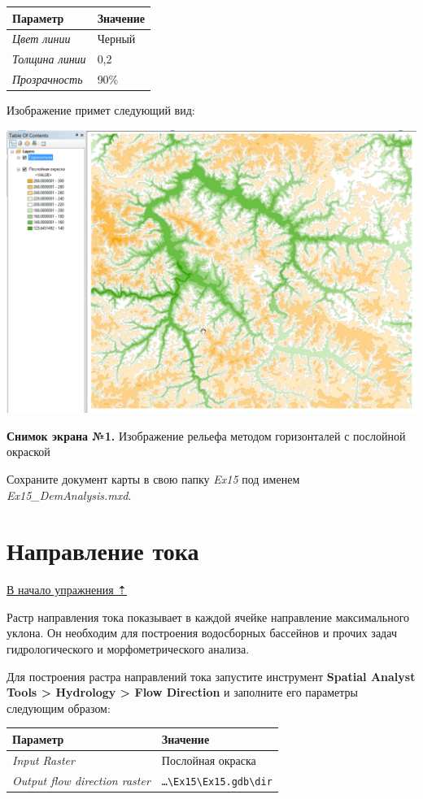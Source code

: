 \documentclass[]{book}
\theoremstyle{definition}
\theoremstyle{definition}
\theoremstyle{definition}
\theoremstyle{remark}
\begin{document}
\begin{enumerate}
  \begin{longtable}[]{@{}ll@{}}
  \toprule
  Параметр & Значение\tabularnewline
  \midrule
  \endhead
  \emph{Цвет линии} & Черный\tabularnewline
  \emph{Толщина линии} & 0,2\tabularnewline
  \emph{Прозрачность} & 90\%\tabularnewline
  \bottomrule
  \end{longtable}

  Изображение примет следующий вид:

  \includegraphics{images/Ex15/image10.png}
\end{enumerate}

\textbf{Снимок экрана №1.} Изображение рельефа методом горизонталей с
послойной окраской

Сохраните документ карты в свою папку \emph{Ex15} под именем
\emph{Ex15\_DemAnalysis.mxd}.

\hypertarget{dem-flowdir}{%
\section{Направление тока}\label{dem-flowdir}}

\protect\hyperlink{dem}{В начало упражнения ⇡}

Растр направления тока показывает в каждой ячейке направление
максимального уклона. Он необходим для построения водосборных бассейнов
и прочих задач гидрологического и морфометрического анализа.

Для построения растра направлений тока запустите инструмент
\textbf{Spatial Analyst Tools \textgreater{} Hydrology \textgreater{}
Flow Direction} и заполните его параметры следующим образом:

\begin{longtable}[]{@{}ll@{}}
\toprule
Параметр & Значение\tabularnewline
\midrule
\endhead
\emph{Input Raster} & Послойная окраска\tabularnewline
\emph{Output flow direction raster} &
\texttt{\ldots{}\textbackslash{}Ex15\textbackslash{}Ex15.gdb\textbackslash{}dir}\tabularnewline
\bottomrule
\end{longtable}
\end{document}
